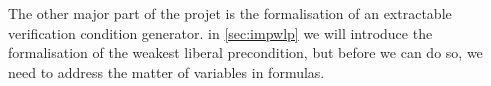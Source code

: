 The other major part of the projet is the formalisation of an extractable verification condition generator.
in \autoref{sec:impwlp} we will introduce the formalisation of the weakest liberal precondition,
but before we can do so, we need to address the matter of variables in formulas.
